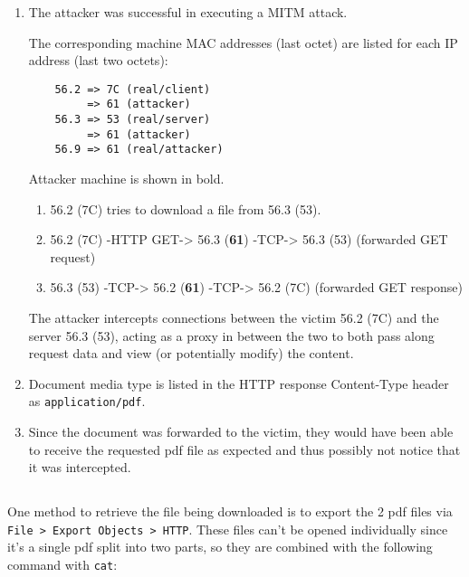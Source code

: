 \documentclass[12pt]{exam}
\begin{document}
\begin{enumerate}[label=\alph*)]
    \item The attacker was successful in executing a MITM attack.

    The corresponding machine MAC addresses (last octet) are listed for each IP
    address (last two octets):

    \begin{lstlisting}
    56.2 => 7C (real/client)
         => 61 (attacker)
    56.3 => 53 (real/server)
         => 61 (attacker)
    56.9 => 61 (real/attacker)
    \end{lstlisting}

    Attacker machine is shown in bold.

    \begin{enumerate}[label=\arabic*)]
        \item 56.2 (7C) tries to download a file from 56.3 (53).
        \item 56.2 (7C) -HTTP GET-> 56.3 (\textbf{61}) -TCP-> 56.3 (53)
        (forwarded GET request)
        \item 56.3 (53) -TCP-> 56.2 (\textbf{61}) -TCP-> 56.2 (7C) (forwarded
        GET response)
    \end{enumerate}

    The attacker intercepts connections between the victim 56.2 (7C) and the
    server 56.3 (53), acting as a proxy in between the two to both pass along
    request data and view (or potentially modify) the content.

    \item Document media type is listed in the HTTP response Content-Type header
    as \lstinline{application/pdf}.
    \item Since the document was forwarded to the victim, they would have been
    able to receive the requested pdf file as expected and thus possibly not
    notice that it was intercepted.
\end{enumerate}

\subsection{}

One method to retrieve the file being downloaded is to export the 2 pdf files
via \lstinline{File > Export Objects > HTTP}.  These files can't be opened
individually since it's a single pdf split into two parts, so they are combined
with the following command with \lstinline{cat}:
\end{document}
